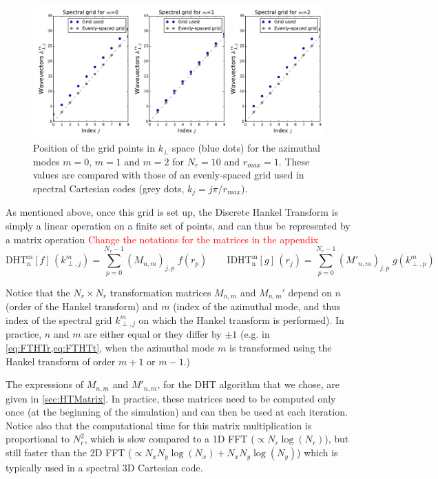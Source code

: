 \documentclass[a4paper]{article}   	%
\newcommand{\comment}[1]{\textcolor{red}{#1}}
\begin{document}
\begin{figure}[!h]
\includegraphics[width=\textwidth]{figures/KGrid.pdf}
\caption{\label{fig:Kgrid}Position of the grid points in $k_\perp$ space
  (blue dots) for the azimuthal modes $m=0$, $m=1$ and $m=2$ for $N_r
  = 10$ and $r_{max}=1$. These values are compared with those of an
  evenly-spaced grid used in spectral Cartesian codes (grey dots, $k_j = j\pi/r_{max}$).}
\end{figure}

As mentioned above, once this grid is set up, the Discrete Hankel Transform is simply a
linear operation on a finite set of points, and can thus be
represented by a matrix operation
\comment{Change the notations for the matrices in the appendix}
\[ \mathrm{DHT^m_n}[f] \,(k^m_{\perp,j}) = \sum_{p=0}^{N_r-1} (M_{n,m})_{j,p}
\;f(r_p) \qquad \mathrm{IDHT^m_n}[g] \, (r_j) = \sum_{p=0}^{N_r-1}
(M'_{n,m})_{j,p} \; g(k^m_{\perp,p}) \]

Notice that the $N_r\times N_r$ transformation matrices $M_{n,m}$ and
$M_{n,m}'$ depend on $n$ (order of the Hankel transform) and $m$
(index of the azimuthal mode, and thus index of the spectral grid
$k^m_{\perp,j}$ on which the Hankel transform is performed). 
In practice, $n$ and $m$ are either equal or they differ by
$\pm 1$ (e.g. in \cref{eq:FTHTr,eq:FTHTt}, when the azimuthal mode $m$ is
transformed using the Hankel transform of order $m+1$ or $m-1$.)

The expressions of $M_{n,m}$ and $M'_{n,m}$, for the DHT algorithm that we chose, are given in
\cref{sec:HTMatrix}. %
In practice,  these matrices need to be
computed only once (at the beginning of the simulation) and can then be used at each
iteration. Notice also that the computational time for this
matrix multiplication is proportional to $N_r^2$, which is slow
compared to a 1D FFT ($\propto N_r \log(N_r)$), but
still faster than the 2D FFT ($\propto N_x N_y \log(N_x) + N_x N_y \log(N_y) $)
which is typically used in a spectral 3D Cartesian code. 
\end{document}

